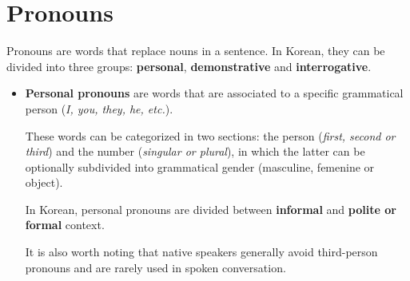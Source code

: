 \section{Pronouns}
Pronouns are words that replace nouns in a sentence. In Korean, they can be divided into three groups: \textbf{personal}, \textbf{demonstrative} and \textbf{interrogative}.

\begin{itemize}
    \item \textbf{Personal pronouns} are words that are associated to a specific grammatical person (\textit{I, you, they, he, etc.}). 
    
    These words can be categorized in two sections: the person (\textit{first, second or third}) and the number (\textit{singular or plural}), in which the latter can be optionally subdivided into grammatical gender (masculine, femenine or object). 
    
    In Korean, personal pronouns are divided between \textbf{informal} and \textbf{polite or formal} context.

    It is also worth noting that native speakers generally avoid third-person pronouns and are rarely used in spoken conversation.
    

\end{itemize}

